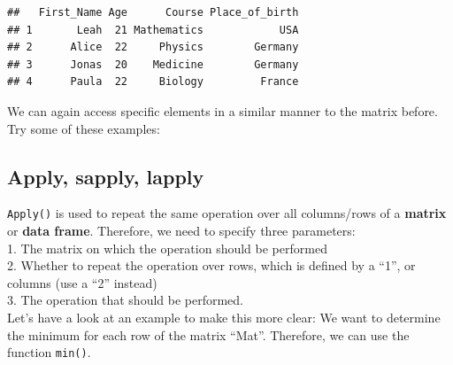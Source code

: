 \documentclass[
]{book}
\newenvironment{Shaded}{\begin{snugshade}}{\end{snugshade}}
\newcommand{\CommentTok}[1]{\textcolor[rgb]{0.56,0.35,0.01}{\textit{#1}}}
\newcommand{\DecValTok}[1]{\textcolor[rgb]{0.00,0.00,0.81}{#1}}
\newcommand{\NormalTok}[1]{#1}
\newcommand{\SpecialCharTok}[1]{\textcolor[rgb]{0.81,0.36,0.00}{\textbf{#1}}}
\newcommand{\StringTok}[1]{\textcolor[rgb]{0.31,0.60,0.02}{#1}}
\begin{document}
\begin{verbatim}
##   First_Name Age      Course Place_of_birth
## 1       Leah  21 Mathematics            USA
## 2      Alice  22     Physics        Germany
## 3      Jonas  20    Medicine        Germany
## 4      Paula  22     Biology         France
\end{verbatim}

We can again access specific elements in a similar manner to the matrix before.
Try some of these examples:

\begin{Shaded}
\end{Shaded}

\hypertarget{apply-sapply-lapply}{%
\subsection*{Apply, sapply, lapply}\label{apply-sapply-lapply}}

\texttt{Apply()} is used to repeat the same operation over all columns/rows of a \textbf{matrix} or \textbf{data frame}.
Therefore, we need to specify three parameters:\\
1.
The matrix on which the operation should be performed\\
2.
Whether to repeat the operation over rows, which is defined by a ``1'', or columns (use a ``2'' instead)\\
3.
The operation that should be performed.\\

Let's have a look at an example to make this more clear: We want to determine the minimum for each row of the matrix ``Mat''.
Therefore, we can use the function \texttt{min()}.
\end{document}
